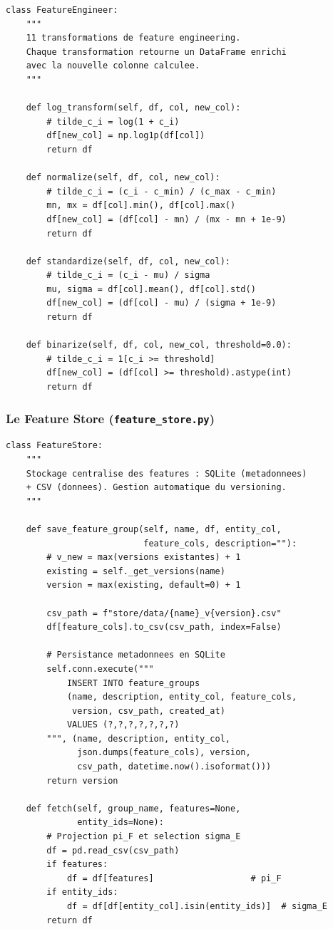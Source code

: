 \documentclass[12pt,a4paper]{article}
\begin{document}
\begin{lstlisting}[caption={Implémentation des transformations clés},
                   label={lst:engineer}]
class FeatureEngineer:
    """
    11 transformations de feature engineering.
    Chaque transformation retourne un DataFrame enrichi
    avec la nouvelle colonne calculee.
    """

    def log_transform(self, df, col, new_col):
        # tilde_c_i = log(1 + c_i)
        df[new_col] = np.log1p(df[col])
        return df

    def normalize(self, df, col, new_col):
        # tilde_c_i = (c_i - c_min) / (c_max - c_min)
        mn, mx = df[col].min(), df[col].max()
        df[new_col] = (df[col] - mn) / (mx - mn + 1e-9)
        return df

    def standardize(self, df, col, new_col):
        # tilde_c_i = (c_i - mu) / sigma
        mu, sigma = df[col].mean(), df[col].std()
        df[new_col] = (df[col] - mu) / (sigma + 1e-9)
        return df

    def binarize(self, df, col, new_col, threshold=0.0):
        # tilde_c_i = 1[c_i >= threshold]
        df[new_col] = (df[col] >= threshold).astype(int)
        return df
\end{lstlisting}

\subsubsection{Le Feature Store (\texttt{feature\_store.py})}

\begin{lstlisting}[caption={Gestion de la persistance et du versioning},
                   label={lst:store}]
class FeatureStore:
    """
    Stockage centralise des features : SQLite (metadonnees)
    + CSV (donnees). Gestion automatique du versioning.
    """

    def save_feature_group(self, name, df, entity_col,
                           feature_cols, description=""):
        # v_new = max(versions existantes) + 1
        existing = self._get_versions(name)
        version = max(existing, default=0) + 1

        csv_path = f"store/data/{name}_v{version}.csv"
        df[feature_cols].to_csv(csv_path, index=False)

        # Persistance metadonnees en SQLite
        self.conn.execute("""
            INSERT INTO feature_groups
            (name, description, entity_col, feature_cols,
             version, csv_path, created_at)
            VALUES (?,?,?,?,?,?,?)
        """, (name, description, entity_col,
              json.dumps(feature_cols), version,
              csv_path, datetime.now().isoformat()))
        return version

    def fetch(self, group_name, features=None,
              entity_ids=None):
        # Projection pi_F et selection sigma_E
        df = pd.read_csv(csv_path)
        if features:
            df = df[features]                   # pi_F
        if entity_ids:
            df = df[df[entity_col].isin(entity_ids)]  # sigma_E
        return df
\end{lstlisting}
\end{document}
